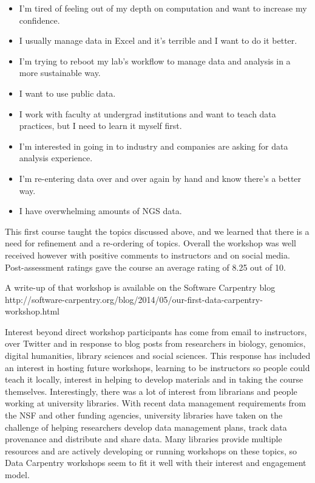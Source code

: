 \documentclass[11pt]{article}
\begin{document}
\begin{itemize}
\item I'm tired of feeling out of my depth on computation and want to increase my confidence.
\item I usually manage data in Excel and it's terrible and I want to do it better.
\item I'm trying to reboot my lab's workflow to manage data and analysis in a more sustainable way.
\item I want to use public data.
\item I work with faculty at undergrad institutions and want to teach data practices, but I need to learn it myself first.
\item I'm interested in going in to industry and companies are asking for data analysis experience.
\item I'm re-entering data over and over again by hand and know there's a better way.
\item I have overwhelming amounts of NGS data.
\end{itemize}

This first course taught the topics discussed above, and we learned that there is a need for refinement and a 
re-ordering of topics. Overall the workshop was well received however with positive comments to instructors and on social media. Post-assessment ratings gave the course an average rating of 8.25 out of 10.

A write-up of that workshop is available on the Software Carpentry blog
\\http://software-carpentry.org/blog/2014/05/our-first-data-carpentry-workshop.html

Interest beyond direct workshop participants has come from email to instructors, over Twitter and in response to blog posts from researchers in biology, genomics, digital humanities, library sciences and social sciences.
This response has 
included an interest in hosting future workshops, learning to be 
instructors so people could teach it locally, interest in helping to develop materials and in taking the course themselves.
Interestingly, there was a lot of interest from librarians and people working at university libraries. With recent data management requirements from the NSF and other funding agencies, university libraries have
taken on the challenge of helping researchers develop data management plans, track data provenance and 
distribute and share data. Many libraries provide multiple resources and are actively developing or running workshops
on these topics, so Data Carpentry workshops seem to fit it well with their interest and engagement model.
\end{document}
